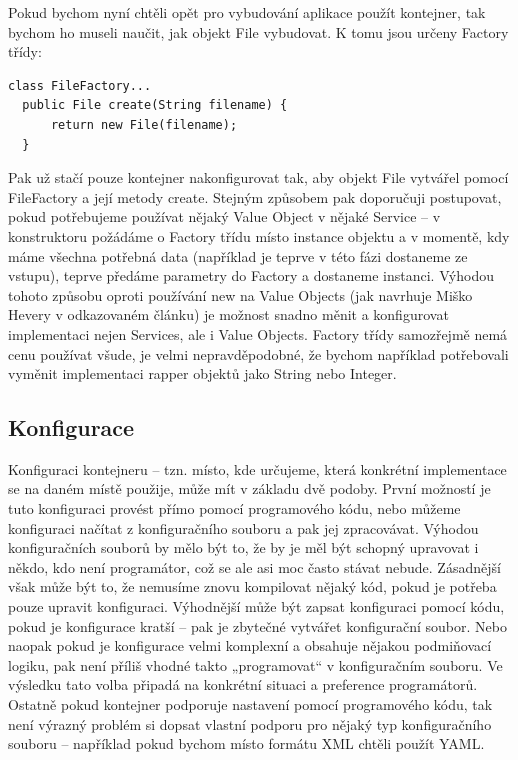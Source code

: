 \documentclass[a4paper,conference]{IEEEtran}
\begin{document}
Pokud bychom nyní chtěli opět pro vybudování aplikace použít kontejner, tak bychom ho museli naučit, jak objekt File vybudovat. K tomu jsou určeny Factory třídy:

\lstset{language=Java, caption=Factory třída pro Value Object, label=listing:Java}
\begin{lstlisting}
class FileFactory...
  public File create(String filename) {
      return new File(filename);
  }
\end{lstlisting}

Pak už stačí pouze kontejner nakonfigurovat tak, aby objekt File vytvářel pomocí FileFactory a její metody create. Stejným způsobem pak doporučuji postupovat, pokud potřebujeme používat nějaký Value Object v nějaké Service – v konstruktoru požádáme o Factory třídu místo instance objektu a v momentě, kdy máme všechna potřebná data (například je teprve v této fázi dostaneme ze vstupu), teprve předáme parametry do Factory a dostaneme instanci. Výhodou tohoto způsobu oproti používání new na Value Objects (jak navrhuje Miško Hevery v odkazovaném článku\cite{How to Think About the new Operator with Respect to Unit Testing}) je možnost snadno měnit a konfigurovat implementaci nejen Services, ale i Value Objects. Factory třídy samozřejmě nemá cenu používat všude, je velmi nepravděpodobné, že bychom například potřebovali vyměnit implementaci rapper objektů jako String nebo Integer.

\subsection{Konfigurace}

Konfiguraci kontejneru – tzn. místo, kde určujeme, která konkrétní implementace se na daném místě použije, může mít v základu dvě podoby. První možností je tuto konfiguraci provést přímo pomocí programového kódu, nebo můžeme konfiguraci načítat z konfiguračního souboru a pak jej zpracovávat.
Výhodou konfiguračních souborů by mělo být to, že by je měl být schopný upravovat i někdo, kdo není programátor, což se ale asi moc často stávat nebude. Zásadnější však může být to, že nemusíme znovu kompilovat nějaký kód, pokud je potřeba pouze upravit konfiguraci.
Výhodnější může být zapsat konfiguraci pomocí kódu, pokud je konfigurace kratší – pak je zbytečné vytvářet konfigurační soubor. Nebo naopak pokud je konfigurace velmi komplexní a obsahuje nějakou podmiňovací logiku, pak není příliš vhodné takto „programovat“ v konfiguračním souboru.
Ve výsledku tato volba připadá na konkrétní situaci a preference programátorů. Ostatně pokud kontejner podporuje nastavení pomocí programového kódu, tak není výrazný problém si dopsat vlastní podporu pro nějaký typ konfiguračního souboru – například pokud bychom místo formátu XML chtěli použít YAML.
\end{document}

